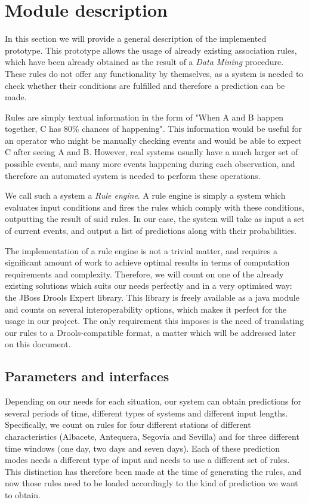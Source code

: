 
\section{Module description}
\label{sec:module_description}
In this section we will provide a general description of the implemented prototype. This prototype allows the usage of already existing association rules, which have been already obtained as the result of a \emph{Data Mining}\cite{torgo2003data}\cite{han2006data} procedure. These rules do not offer any functionality by themselves, as a system is needed to check whether their conditions are fulfilled and therefore a prediction can be made.

Rules are simply textual information in the form of "When A and B happen together, C has 80\% chances of happening". This information would be useful for an operator who might be manually checking events and would be able to expect C after seeing A and B. However, real systems usually have a much larger set of possible events, and many more events happening during each observation, and therefore an automated system is needed to perform these operations.

We call such a system a \emph{Rule engine}\cite{liang2009openrulebench}. A rule engine is simply a system which evaluates input conditions and fires the rules which comply with these conditions, outputting the result of said rules. In our case, the system will take as input a set of current events, and output a list of predictions along with their probabilities.

The implementation of a rule engine is not a trivial matter, and requires a significant amount of work to achieve optimal results in terms of computation requirements and complexity. Therefore, we will count on one of the already existing solutions which suits our needs perfectly and in a very optimised way: the JBoss Drools Expert library\cite{browne2009jboss}. This library is freely available as a java module and counts on several interoperability options, which makes it perfect for the usage in our project. The only requirement this imposes is the need of translating our rules to a Drools-compatible format, a matter which will be addressed later on this document.

\subsection{Parameters and interfaces}
\label{sec:parameters_and_interfaces}
Depending on our needs for each situation, our system can obtain predictions for several periods of time, different types of systems and different input lengths. Specifically, we count on rules for four different stations of different characteristics (Albacete, Antequera, Segovia and Sevilla) and for three different time windows (one day, two days and seven days). Each of these prediction modes needs a different type of input and needs to use a different set of rules. This distinction has therefore been made at the time of generating the rules, and now those rules need to be loaded accordingly to the kind of prediction we want to obtain.

